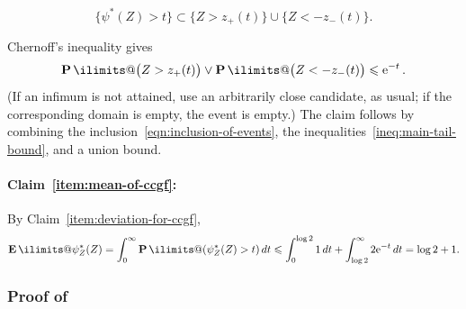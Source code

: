 \documentclass[11pt, letterpaper, hidelinks]{article}
\makeatletter
\newcommand{\twomax}[2]{\ensuremath{#1 \lor #2}}
\newcommand{\e}{\mathrm{e}}
\newcommand{\1}{\mathbf 1}
\renewcommand{\leq}{\leqslant}
\newcommand{\E}{\operatorname*{\mathbf{E}}\ilimits@}
\renewcommand{\P}{\operatorname*{\mathbf{P}}\ilimits@}
\theoremstyle{plain}
\theoremstyle{definition}
\makeatother
\begin{document}
\begin{equation}
\label{eqn:inclusion-of-events}
\{\psi^\ast(Z) > t\} \subset \{Z > z_+(t)\} \cup \{Z < -z_-(t)\}.
\end{equation}

Chernoff's inequality gives
\begin{equation}\label{ineq:main-tail-bound}
	\twomax{\P\big(Z>z_+(t)\big)}{\P\big(Z< -z_-(t)\big)} \leq \e^{-t} \, .
\end{equation}
(If an infimum is not attained, use an arbitrarily close candidate, as usual; if the corresponding domain is empty, the event is empty.)
The claim follows by combining the inclusion~\eqref{eqn:inclusion-of-events}, the inequalities~\eqref{ineq:main-tail-bound}, and a union bound.

\paragraph{Claim~\ref{item:mean-of-ccgf}:}

By Claim~\ref{item:deviation-for-ccgf},
\[
\E\psi_Z^\ast(Z) = \int_0^\infty \P(\psi_Z^\ast(Z) > t)\,dt
\leq \int_0^{\log 2} 1\,dt + \int_{\log 2}^\infty 2\e^{-t}\,dt
= \log 2 + 1.
\]

\subsubsection{Proof of~}
\label{sec:proof-prop-var-car-log-lik-stat}
\end{document}
